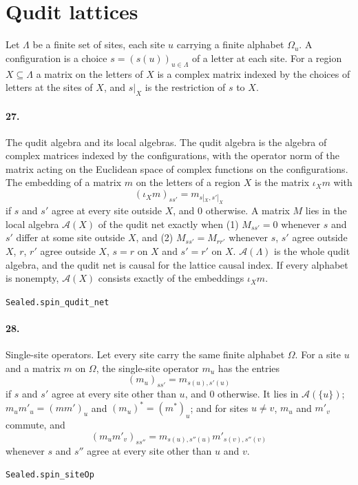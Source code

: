 \documentclass[11pt]{article}
\begin{document}
\section*{Qudit lattices}
Let $\Lambda$ be a finite set of sites, each site $u$ carrying a finite alphabet $\Omega_u$. A configuration is a choice $s = (s(u))_{u \in \Lambda}$ of a letter at each site. For a region $X \subseteq \Lambda$ a matrix on the letters of $X$ is a complex matrix indexed by the choices of letters at the sites of $X$, and $s|_X$ is the restriction of $s$ to $X$.

\paragraph{27.} The qudit algebra and its local algebras. The qudit algebra is the algebra of complex matrices indexed by the configurations, with the operator norm of the matrix acting on the Euclidean space of complex functions on the configurations. The embedding of a matrix $m$ on the letters of a region $X$ is the matrix $\iota_X m$ with \[(\iota_X m)_{s s'} = m_{s|_X, s'|_X}\] if $s$ and $s'$ agree at every site outside $X$, and $0$ otherwise. A matrix $M$ lies in the local algebra $\mathcal A(X)$ of the qudit net exactly when (1) $M_{s s'} = 0$ whenever $s$ and $s'$ differ at some site outside $X$, and (2) $M_{s s'} = M_{r r'}$ whenever $s$, $s'$ agree outside $X$, $r$, $r'$ agree outside $X$, $s = r$ on $X$ and $s' = r'$ on $X$. $\mathcal A(\Lambda)$ is the whole qudit algebra, and the qudit net is causal for the lattice causal index. If every alphabet is nonempty, $\mathcal A(X)$ consists exactly of the embeddings $\iota_X m$.\par{\footnotesize\texttt{Sealed.spin\_qudit\_net}}

\paragraph{28.} Single-site operators. Let every site carry the same finite alphabet $\Omega$. For a site $u$ and a matrix $m$ on $\Omega$, the single-site operator $m_u$ has the entries \[(m_u)_{s s'} = m_{s(u), s'(u)}\] if $s$ and $s'$ agree at every site other than $u$, and $0$ otherwise. It lies in $\mathcal A(\{u\})$; $m_u m'_u = (m m')_u$ and $(m_u)^* = (m^*)_u$; and for sites $u \neq v$, $m_u$ and $m'_v$ commute, and \[(m_u m'_v)_{s s''} = m_{s(u), s''(u)} m'_{s(v), s''(v)}\] whenever $s$ and $s''$ agree at every site other than $u$ and $v$.\par{\footnotesize\texttt{Sealed.spin\_siteOp}}
\end{document}
